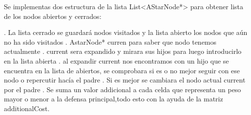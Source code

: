 


Se implementas dos estructura de la lista List<AStarNode*> para obtener lista de los nodos abiertos y cerrados:

	. La lista cerrado se guardará nodos visitados y la lista abierto los nodos que aún no ha sido visitados
	. AstarNode* curren para saber que nodo tenemos actualmente
	. current sera expandido y mirara sus hijos para luego introducirlo en la lista abierta
	. al expandir current nos encontramos con un hijo que se encuentra en la lista de abiertos, se comprobara si es o no mejor seguir con ese nodo o repercutir 		hacía el padre
	. Si es mejor se cambiara el nodo actual current por el padre
	. Se suma un valor addicional a cada celda que representa un peso mayor o menor a la defensa principal,todo esto con la ayuda de la matriz additionalCost.






